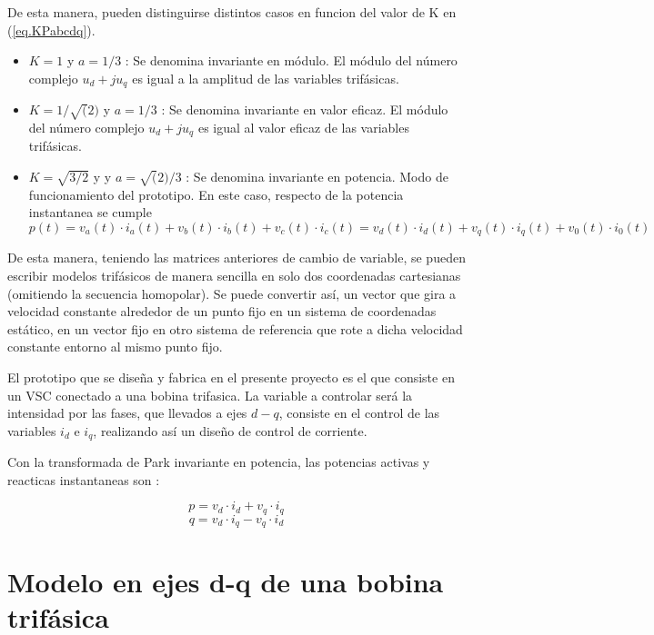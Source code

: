 \documentclass{report}
\begin{document}
De esta manera, pueden distinguirse distintos casos en funcion del valor de K en (\ref{eq.KPabcdq}).


\begin{itemize}
\item $K = 1$ y $a = 1/3$ : Se denomina invariante en módulo. El módulo del número complejo $u_d + ju_q$ es igual a la amplitud de las variables trifásicas.
\item $K = 1/\sqrt(2)$ y $a = 1/3$  : Se denomina invariante en valor eficaz. El módulo del número complejo $u_d + ju_q$ es igual al valor eficaz de las variables trifásicas. 
\item $K = \sqrt{3/2}$ y y $a = \sqrt(2)/3$ : Se denomina invariante en potencia. Modo de funcionamiento del prototipo. En este caso, respecto de la potencia instantanea se cumple \newline $p(t) = v_a(t)\cdot i_a(t) + v_b(t)\cdot i_b(t) + v_c(t)\cdot i_c(t) = v_d(t)\cdot i_d(t) + v_q(t)\cdot i_q(t) + v_0(t)\cdot i_0(t)$
\end{itemize}

De esta manera, teniendo las matrices anteriores de cambio de variable, se pueden escribir modelos trifásicos de manera sencilla en solo dos coordenadas cartesianas (omitiendo la secuencia homopolar). Se puede convertir así, un vector que gira a velocidad constante alrededor de un punto fijo en un sistema de coordenadas estático, en un vector fijo en otro sistema de referencia que rote a dicha velocidad constante entorno al mismo punto fijo.


El prototipo que se diseña y fabrica en el presente proyecto es el que consiste en un VSC conectado a una bobina trifasica. La variable a controlar será la intensidad por las fases, que llevados a ejes $d - q$, consiste en el control de las variables $i_{d}$ e $i_{q}$, realizando así un diseño de control de corriente\cite{treintaydos}.

Con la transformada de Park invariante en potencia, las potencias activas y reacticas instantaneas son \cite{cuarentaydos}:

\begin{equation}
    p = v_{d} \cdot i_{d} + v_{q} \cdot i_{q} \label{eq.p}  
\end{equation}
\begin{equation}
    q = v_{d} \cdot i_{q} - v_{q} \cdot i_{d}\label{eq.q}  
\end{equation}


\section{Modelo en ejes d-q de una bobina trifásica} \label{sec.modeloenejesdqdeunabobinatrifasica}
\end{document}
